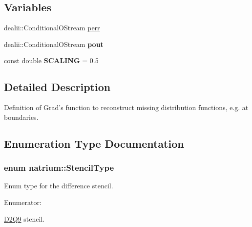 \subsection*{Variables}
\begin{DoxyCompactItemize}
\item 
dealii::ConditionalOStream \hyperlink{namespacenatrium_a3cedd4d2c74ed3a6e0f61166ddff40d1}{perr}
\item 
\hypertarget{namespacenatrium_ae1c1457daa96180a3ee2057cf5f7f9e3}{
dealii::ConditionalOStream {\bfseries pout}}
\label{namespacenatrium_ae1c1457daa96180a3ee2057cf5f7f9e3}

\item 
\hypertarget{namespacenatrium_a43f9d1a94de3cd6d8515e213d9c389cc}{
const double {\bfseries SCALING} = 0.5}
\label{namespacenatrium_a43f9d1a94de3cd6d8515e213d9c389cc}

\end{DoxyCompactItemize}


\subsection{Detailed Description}
Definition of Grad's function to reconstruct missing distribution functions, e.g. at boundaries. 

\subsection{Enumeration Type Documentation}
\hypertarget{namespacenatrium_a45d5dacaf5eb5efde670179d949173ba}{
\subsubsection[{StencilType}]{\setlength{\rightskip}{0pt plus 5cm}enum {\bf natrium::StencilType}}}
\label{namespacenatrium_a45d5dacaf5eb5efde670179d949173ba}


Enum type for the difference stencil. \begin{Desc}
\item[Enumerator: ]\par
\begin{description}
\item[{\em 
\hypertarget{namespacenatrium_a45d5dacaf5eb5efde670179d949173baabe9c0ce3734a5131262789758ca5fbd1}{
Stencil\_\-D2Q9}
\label{namespacenatrium_a45d5dacaf5eb5efde670179d949173baabe9c0ce3734a5131262789758ca5fbd1}
}]\hyperlink{classnatrium_1_1D2Q9}{D2Q9} stencil. \end{description}
\end{Desc}

